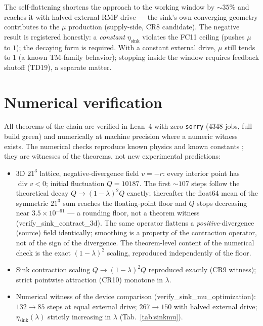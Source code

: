 \documentclass[aps,prd,preprint,superscriptaddress,amsmath,amssymb]{revtex4-2}
\begin{document}
The self-flattening shortens the approach to the working window by
$\sim35\%$ and reaches it with halved external RMF drive --- the
sink's own converging geometry contributes to the $\mu$ production
(supply-side, CR8 candidate).  The negative result is registered
honestly: a \emph{constant} $\eta_{\text{sink}}$ violates the FC11
ceiling (pushes $\mu$ to $1$); the decaying form is required.  With a
constant external drive, $\mu$ still tends to $1$ (a known TM-family
behavior); stopping inside the window requires feedback shutoff
(TD19), a separate matter.

\section{Numerical verification}
\label{sec:numerics}

All theorems of the chain are verified in Lean~4 with zero
\texttt{sorry} (4348 jobs, full build green) \cite{de2015lean} and
numerically at machine precision where a numeric witness exists.  The
numerical checks reproduce known physics and known constants
\cite{navas2024review}; they are witnesses of the theorems, not new
experimental predictions:

\begin{itemize}
\item 3D $21^3$ lattice, negative-divergence field $v=-r$: every
interior point has $\operatorname{div} v<0$; initial fluctuation
$Q=10187$.  The first $\sim107$ steps follow the theoretical decay
$Q\to(1-\lambda)^2 Q$ exactly; thereafter the float64 mean of the
symmetric $21^3$ sum reaches the floating-point floor and $Q$ stops
decreasing near $3.5\times10^{-61}$ --- a rounding floor, not a
theorem witness (verify\_sink\_contract\_3d).  The same operator
flattens a \emph{positive}-divergence (source) field identically;
smoothing is a property of the contraction operator, not of the sign
of the divergence.  The theorem-level content of the numerical check
is the exact $(1-\lambda)^2$ scaling, reproduced independently of the
floor.
\item Sink contraction scaling $Q\to(1-\lambda)^2Q$ reproduced exactly
(CR9 witness); strict pointwise attraction (CR10) monotone in
$\lambda$.
\item Numerical witness of the device comparison
(verify\_sink\_mu\_optimization): $132\to85$ steps at equal
external drive; $267\to150$ with halved external drive;
$\eta_{\text{sink}}(\lambda)$ strictly increasing in
$\lambda$ (Tab.~\ref{tab:sinkmu}).
\end{itemize}
\end{document}
